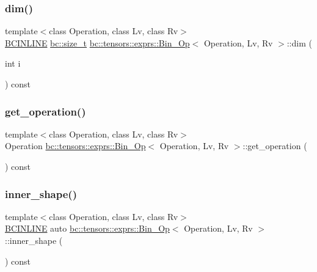 \subsubsection{\texorpdfstring{dim()}{dim()}}
{\footnotesize\ttfamily template$<$class Operation, class Lv, class Rv$>$ \\
\hyperlink{common_8h_a6699e8b0449da5c0fafb878e59c1d4b1}{B\+C\+I\+N\+L\+I\+NE} \hyperlink{namespacebc_aaf8e3fbf99b04b1b57c4f80c6f55d3c5}{bc\+::size\+\_\+t} \hyperlink{structbc_1_1tensors_1_1exprs_1_1Bin__Op}{bc\+::tensors\+::exprs\+::\+Bin\+\_\+\+Op}$<$ Operation, Lv, Rv $>$\+::dim (\begin{DoxyParamCaption}\item[{int}]{i }\end{DoxyParamCaption}) const\hspace{0.3cm}{\ttfamily [inline]}}

\mbox{\label{structbc_1_1tensors_1_1exprs_1_1Bin__Op_a767518d5bd0acf986a00f69d044994f8}} 
\subsubsection{\texorpdfstring{get\+\_\+operation()}{get\_operation()}}
{\footnotesize\ttfamily template$<$class Operation, class Lv, class Rv$>$ \\
Operation \hyperlink{structbc_1_1tensors_1_1exprs_1_1Bin__Op}{bc\+::tensors\+::exprs\+::\+Bin\+\_\+\+Op}$<$ Operation, Lv, Rv $>$\+::get\+\_\+operation (\begin{DoxyParamCaption}{ }\end{DoxyParamCaption}) const\hspace{0.3cm}{\ttfamily [inline]}}

\mbox{\label{structbc_1_1tensors_1_1exprs_1_1Bin__Op_a6d38ff7ba2dabc884373d141a0a2e924}} 
\subsubsection{\texorpdfstring{inner\+\_\+shape()}{inner\_shape()}}
{\footnotesize\ttfamily template$<$class Operation, class Lv, class Rv$>$ \\
\hyperlink{common_8h_a6699e8b0449da5c0fafb878e59c1d4b1}{B\+C\+I\+N\+L\+I\+NE} auto \hyperlink{structbc_1_1tensors_1_1exprs_1_1Bin__Op}{bc\+::tensors\+::exprs\+::\+Bin\+\_\+\+Op}$<$ Operation, Lv, Rv $>$\+::inner\+\_\+shape (\begin{DoxyParamCaption}{ }\end{DoxyParamCaption}) const\hspace{0.3cm}{\ttfamily [inline]}}

